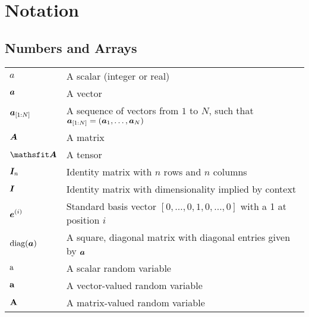 \chapter*{Notation}

\def\arraystretch{1.5}
\section*{Numbers and Arrays}
\begin{longtable}{p{}p{}}
$\displaystyle a$ & A scalar (integer or real)\\
$\displaystyle {\bm{a}}$ & A vector\\
$\displaystyle {\bm{a}}_{ \left[1:N\right]}$ & A sequence of vectors from $1$ to $N$, such that 
$\displaystyle {\bm{a}}_{ \left[1:N\right]} = ({\bm{a}}_1,\dots,{\bm{a}}_N)$
\\
$\displaystyle {\bm{A}}$ & A matrix\\
$\displaystyle \tA$ & A tensor\\
$\displaystyle {\bm{I}}_n$ & Identity matrix with $n$ rows and $n$ columns\\
$\displaystyle {\bm{I}}$ & Identity matrix with dimensionality implied by context\\
$\displaystyle {\bm{e}}^{(i)}$ & Standard basis vector $[0,\dots,0,1,0,\dots,0]$ with a 1 at position $i$\\
$\displaystyle \text{diag}({\bm{a}})$ & A square, diagonal matrix with diagonal entries given by ${\bm{a}}$\\
$\displaystyle {\textnormal{a}}$ & A scalar random variable\\
$\displaystyle {\mathbf{a}}$ & A vector-valued random variable\\
$\displaystyle {\mathbf{A}}$ & A matrix-valued random variable\\
\end{longtable}

%
